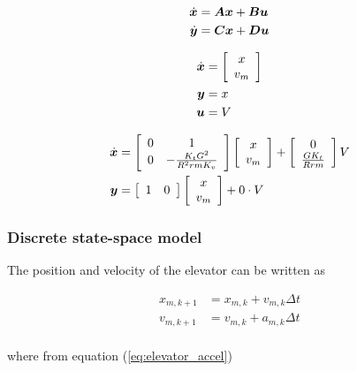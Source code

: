 \begin{align*}
  \dot{\bm x} &= \bm A \bm x + \bm B \bm u \\
  \dot{\bm y} &= \bm C \bm x + \bm D \bm u
\end{align*}

\begin{align*}
  \dot{\bm x} &= \left[
  \begin{array}{c}
    x \\
    v_m
  \end{array}
  \right] \\
  \bm y &= x \\
  \bm u &= V
\end{align*}

\begin{align}
  \dot{\bm x} &= \left[
  \begin{array}{cc}
    0 & 1 \\
    0 & -\frac{K_t G^2}{R^2rmK_v}
  \end{array}
  \right] \left[
  \begin{array}{c}
    x \\
    v_m \\
  \end{array}
  \right] + \left[
  \begin{array}{c}
    0 \\
    \frac{GK_t}{Rrm}
  \end{array}
  \right] V \\
  \bm y &= \left[
  \begin{array}{cc}
    1 & 0
  \end{array}
  \right] \left[
  \begin{array}{c}
    x \\
    v_m \\
  \end{array}
  \right] + 0 \cdot V
\end{align}

\subsubsection{Discrete state-space model}

The position and velocity of the elevator can be written as

\begin{align}
  x_{m,k+1} &= x_{m,k} + v_{m,k} \Delta t \label{eq:elevator_disc_ss_pos} \\
  v_{m,k+1} &= v_{m,k} + a_{m,k} \Delta t \label{eq:elevator_disc_ss_vel}
\end{align}
\\
where from equation (\ref{eq:elevator_accel})

